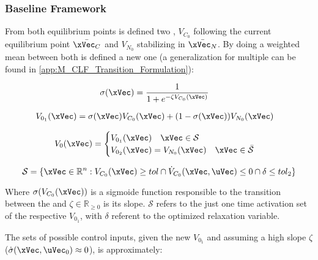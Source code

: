 \subsubsection{Baseline Framework}
\label{subsubsec:CLFs_Summed_Algorithm_Baseline_Framework}

From both equilibrium points is defined two , \(V_{C_0}\) following the current equilibrium point \(\bar{\xVec_C}\) and \(V_{N_0}\) stabilizing in \(\bar{\xVec_N}\). By doing a weighted  mean between both  is defined a new one (a generalization for multiple  can be found in \ref{app:M_CLF_Transition_Formulation}):

\begin{align}
    &\sigma(\xVec) = \frac{1}{1+e^{-\zeta V_{C_0}(\xVec)}} \label{eq:sig_CLF_Vc0} 
\end{align}

\begin{align}
    &V_{0_1}(\xVec) =    \sigma(\xVec) V_{C_0}(\xVec) + (1 - \sigma(\xVec))V_{N_0}(\xVec) \label{eq:1stPhase_2-CLF-S}   
\end{align}

\begin{align}
    V_0(\xVec) = 
    \begin{cases}
        V_{0_1}(\xVec) \quad \xVec \in \mathcal{S}\\
        V_{0_2}(\xVec) = V_{N_0}(\xVec) \quad \xVec \in \bar{\mathcal{S}}
    \end{cases}
    \label{eq:New_2-CLF-S}
\end{align}

\begin{equation}
    \mathcal{S} = \{\xVec \in \mathbb{R}^n: V_{C_0}(\xVec) \geq tol \cap \dot{V}_{C_0}(\xVec, \uVec) \leq 0 \cap \delta \leq tol_2 \}
    \label{eq:New_2-CLF-S_actuationPhaseSet}
\end{equation}

Where \(\sigma(V_{C_0}(\xVec))\) is a sigmoide function responsible to the transition between the  and \(\zeta \in \mathbb{R}_{\geq 0}\) is its slope. \(\mathcal{S}\) refers to the just one time activation set of the respective  \(V_{0_1}\), with \(\delta\) referent to the   optimized relaxation variable. 

The sets of possible control inputs, given the new  \(V_{0_1}\) and assuming a high slope \(\zeta\) (\(\dot{\sigma}(\xVec, \uVec_0)\approx 0\)), is approximately:

